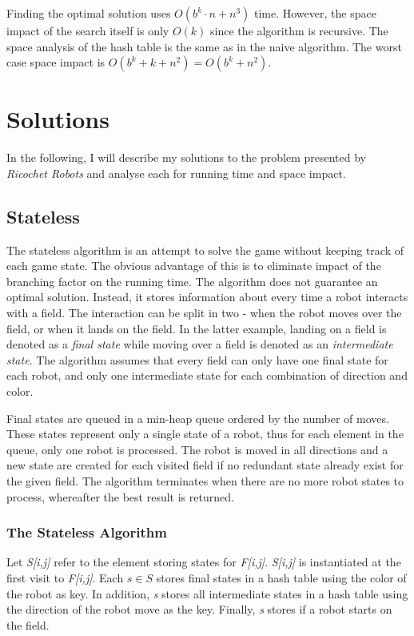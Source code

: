 \documentclass[]{article}
\begin{document}
Finding the optimal solution uses \(O(b^k \cdot n + n^3)\) time.
However, the space impact of the search itself is only \(O(k)\) since
the algorithm is recursive. The space analysis of the hash table is the
same as in the naive algorithm. The worst case space impact is
\(O(b^k+k+n^2) = O(b^k+n^2)\).

\section{Solutions}\label{solutions}

In the following, I will describe my solutions to the problem presented
by \emph{Ricochet Robots} and analyse each for running time and space
impact.

\subsection{Stateless}\label{stateless}

The stateless algorithm is an attempt to solve the game without keeping
track of each game state. The obvious advantage of this is to eliminate
impact of the branching factor on the running time. The algorithm does
not guarantee an optimal solution. Instead, it stores information about
every time a robot interacts with a field. The interaction can be split
in two - when the robot moves over the field, or when it lands on the
field. In the latter example, landing on a field is denoted as a
\emph{final state} while moving over a field is denoted as an
\emph{intermediate state}. The algorithm assumes that every field can
only have one final state for each robot, and only one intermediate
state for each combination of direction and color.

Final states are queued in a min-heap queue ordered by the number of
moves. These states represent only a single state of a robot, thus for
each element in the queue, only one robot is processed. The robot is
moved in all directions and a new state are created for each visited
field if no redundant state already exist for the given field. The
algorithm terminates when there are no more robot states to process,
whereafter the best result is returned.

\subsubsection{The Stateless Algorithm}\label{the-stateless-algorithm}

Let \emph{S{[}i,j{]}} refer to the element storing states for
\emph{F{[}i,j{]}}. \emph{S{[}i,j{]}} is instantiated at the first visit
to \emph{F{[}i,j{]}}. Each \(s \in S\) stores final states in a hash
table using the color of the robot as key. In addition, \emph{s} stores
all intermediate states in a hash table using the direction of the robot
move as the key. Finally, \emph{s} stores if a robot starts on the
field.
\end{document}
